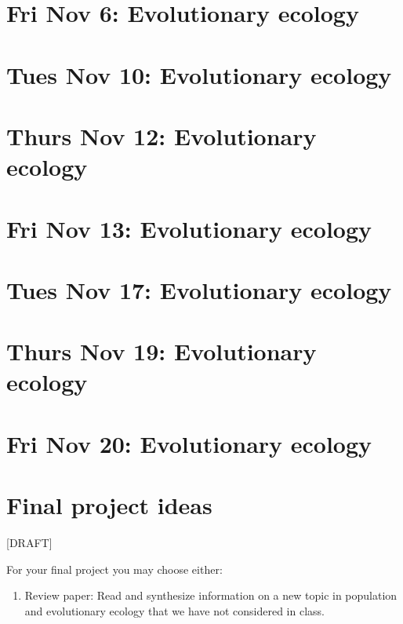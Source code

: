 \documentclass[]{book}
\providecommand{\tightlist}{%
  \setlength{\itemsep}{0pt}\setlength{\parskip}{0pt}}
\begin{document}
\chapter{Fri Nov 6: Evolutionary
ecology}\label{fri-nov-6-evolutionary-ecology}

\chapter{Tues Nov 10: Evolutionary
ecology}\label{tues-nov-10-evolutionary-ecology}

\chapter{Thurs Nov 12: Evolutionary
ecology}\label{thurs-nov-12-evolutionary-ecology}

\chapter{Fri Nov 13: Evolutionary
ecology}\label{fri-nov-13-evolutionary-ecology}

\chapter{Tues Nov 17: Evolutionary
ecology}\label{tues-nov-17-evolutionary-ecology}

\chapter{Thurs Nov 19: Evolutionary
ecology}\label{thurs-nov-19-evolutionary-ecology}

\chapter{Fri Nov 20: Evolutionary
ecology}\label{fri-nov-20-evolutionary-ecology}

\chapter{Final project ideas}\label{final-project-ideas}

{[}DRAFT{]}

For your final project you may choose either:

\begin{enumerate}
\def\labelenumi{\arabic{enumi}.}
\tightlist
\item
  Review paper: Read and synthesize information on a new topic in
  population and evolutionary ecology that we have not considered in
  class.
\end{enumerate}
\end{document}
